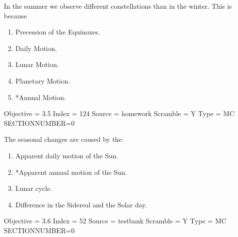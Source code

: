 \documentclass[11pt]{article}
\begin{document}
\begin{enumerate}
\begin{minipage}{\textwidth}
\begin{minipage}{\textwidth}
\item In the summer we observe different constellations than in the winter. This is because \underline{\hspace{0.5in}}
\begin{multicols}{2}
\begin{enumerate} 
\setlength{\itemsep}{1pt} 
\setlength{\parskip}{0pt} 
\setlength{\parsep}{0pt}
\setlength{\multicolsep}{1pt} 
\item Precession of the Equinoxes.
\item Daily Motion.
\item Lunar Motion.
\item Planetary Motion.
\item *Annual Motion.
\end{enumerate} 
\vfill 
\end{multicols}

Objective = 3.5
Index = 124
Source = homework
Scramble = Y
Type = MC
SECTIONNUMBER=0
\end{minipage}
\end{minipage}
\vskip 0.20in

\begin{minipage}{\textwidth}
\begin{minipage}{\textwidth}
\item The seasonal changes are caused by the:
\begin{enumerate} 
\setlength{\itemsep}{1pt} 
\setlength{\parskip}{0pt} 
\setlength{\parsep}{0pt}
\setlength{\multicolsep}{1pt} 
\item Apparent daily motion of the Sun.
\item *Apparent annual motion of the Sun.
\item Lunar cycle.
\item Difference in the Sidereal and the Solar day.
\end{enumerate} 
Objective = 3.6
Index = 52
Source = testbank
Scramble = Y
Type = MC
SECTIONNUMBER=0
\end{minipage}
\end{minipage}
\vskip 0.20in


\end{enumerate}
\end{document}
